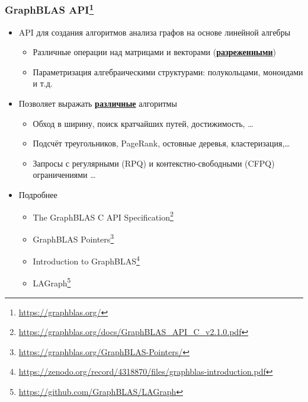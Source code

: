 \documentclass[xcolor=table,aspectratio=169]{beamer}
\begin{document}
\begin{frame}[fragile]
  \frametitle{GraphBLAS API\footnote{\url{https://graphblas.org/}}}
  \begin{itemize}
    \item API для создания алгоритмов анализа графов на основе линейной алгебры 
    \begin{itemize}
      \item Различные операции над матрицами и векторами (\underline{\textbf{разреженными}})
      \item Параметризация алгебраическими структурами: полукольцами, моноидами и т.д.
    \end{itemize}
    \item Позволяет выражать \underline{\textbf{различные}} алгоритмы
    \begin{itemize}
      \item Обход в ширину, поиск кратчайших путей, достижимость, \ldots
      \item Подсчёт треугольников, PageRank, остовные деревья, кластеризация,\ldots
      \item Запросы с регулярными (RPQ) и контекстно-свободными (CFPQ) ограничениями \ldots      
    \end{itemize}
    \item Подробнее
    \begin{itemize}
      \item The GraphBLAS C API Specification\footnote{\url{https://graphblas.org/docs/GraphBLAS_API_C_v2.1.0.pdf}}
      \item GraphBLAS Pointers\footnote{\url{https://graphblas.org/GraphBLAS-Pointers/}}
      \item Introduction to GraphBLAS\footnote{\url{https://zenodo.org/record/4318870/files/graphblas-introduction.pdf}}
      \item LAGraph\footnote{\url{https://github.com/GraphBLAS/LAGraph}}
    \end{itemize}
    \end{itemize}
\end{frame}
\end{document}
